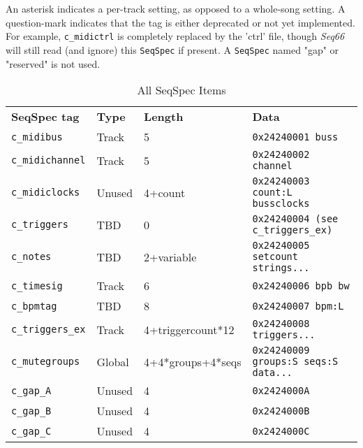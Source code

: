    An asterisk indicates a per-track setting, as
   opposed to a whole-song setting. A question-mark indicates that the tag is
   either deprecated or not yet implemented.
   For example, \texttt{c\_midictrl} is completely replaced by the
   'ctrl' file, though \textsl{Seq66} will still read (and ignore)
   this \texttt{SeqSpec} if present.
   A \texttt{SeqSpec} named "gap" or "reserved" is not used.

   \begin{table}[htb]
      \centering
      \caption{All SeqSpec Items}
      \label{table:seqspec_items_all}
      \begin{tabular}{l l l l}
         \textbf{SeqSpec tag}        & \textbf{Type} & \textbf{Length}   & \textbf{Data} \\
         \texttt{c\_midibus}         & Track         & 5                 & \texttt{0x24240001 buss} \\
         \texttt{c\_midichannel}     & Track         & 5                 & \texttt{0x24240002 channel} \\
         \texttt{c\_midiclocks}      & Unused        & 4+count           & \texttt{0x24240003 count:L bussclocks} \\
         \texttt{c\_triggers}        & TBD           & 0                 & \texttt{0x24240004 (see c\_triggers\_ex)} \\
         \texttt{c\_notes}           & TBD           & 2+variable        & \texttt{0x24240005 setcount strings...} \\
         \texttt{c\_timesig}         & Track         & 6                 & \texttt{0x24240006 bpb bw} \\
         \texttt{c\_bpmtag}          & TBD           & 8                 & \texttt{0x24240007 bpm:L } \\
         \texttt{c\_triggers\_ex}    & Track         & 4+triggercount*12 & \texttt{0x24240008 triggers...} \\
         \texttt{c\_mutegroups}      & Global        & 4+4*groups+4*seqs & \texttt{0x24240009 groups:S seqs:S data...} \\
         \texttt{c\_gap\_A}          & Unused        & 4                 & \texttt{0x2424000A} \\
         \texttt{c\_gap\_B}          & Unused        & 4                 & \texttt{0x2424000B} \\
         \texttt{c\_gap\_C}          & Unused        & 4                 & \texttt{0x2424000C} \\

\end{tabular}
\end{table}
